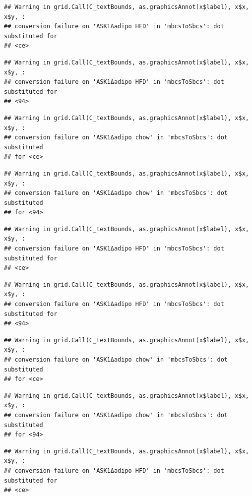 \documentclass[]{book}
\begin{document}
\begin{verbatim}
## Warning in grid.Call(C_textBounds, as.graphicsAnnot(x$label), x$x, x$y, :
## conversion failure on 'ASK1Δadipo HFD' in 'mbcsToSbcs': dot substituted for
## <ce>
\end{verbatim}

\begin{verbatim}
## Warning in grid.Call(C_textBounds, as.graphicsAnnot(x$label), x$x, x$y, :
## conversion failure on 'ASK1Δadipo HFD' in 'mbcsToSbcs': dot substituted for
## <94>
\end{verbatim}

\begin{verbatim}
## Warning in grid.Call(C_textBounds, as.graphicsAnnot(x$label), x$x, x$y, :
## conversion failure on 'ASK1Δadipo chow' in 'mbcsToSbcs': dot substituted
## for <ce>
\end{verbatim}

\begin{verbatim}
## Warning in grid.Call(C_textBounds, as.graphicsAnnot(x$label), x$x, x$y, :
## conversion failure on 'ASK1Δadipo chow' in 'mbcsToSbcs': dot substituted
## for <94>
\end{verbatim}

\begin{verbatim}
## Warning in grid.Call(C_textBounds, as.graphicsAnnot(x$label), x$x, x$y, :
## conversion failure on 'ASK1Δadipo HFD' in 'mbcsToSbcs': dot substituted for
## <ce>
\end{verbatim}

\begin{verbatim}
## Warning in grid.Call(C_textBounds, as.graphicsAnnot(x$label), x$x, x$y, :
## conversion failure on 'ASK1Δadipo HFD' in 'mbcsToSbcs': dot substituted for
## <94>
\end{verbatim}

\begin{verbatim}
## Warning in grid.Call(C_textBounds, as.graphicsAnnot(x$label), x$x, x$y, :
## conversion failure on 'ASK1Δadipo chow' in 'mbcsToSbcs': dot substituted
## for <ce>
\end{verbatim}

\begin{verbatim}
## Warning in grid.Call(C_textBounds, as.graphicsAnnot(x$label), x$x, x$y, :
## conversion failure on 'ASK1Δadipo chow' in 'mbcsToSbcs': dot substituted
## for <94>
\end{verbatim}

\begin{verbatim}
## Warning in grid.Call(C_textBounds, as.graphicsAnnot(x$label), x$x, x$y, :
## conversion failure on 'ASK1Δadipo HFD' in 'mbcsToSbcs': dot substituted for
## <ce>
\end{verbatim}
\end{document}
